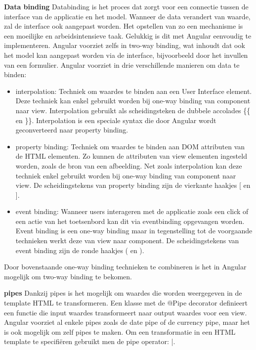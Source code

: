 \textbf{Data binding} \hspace{1cm} Databinding is het proces dat zorgt voor een connectie tussen de interface van de applicatie en het model. Wanneer de data verandert van waarde, zal de interface ook aangepast worden. Het opstellen van zo een mechanisme is een moeilijke en arbeidsintensieve taak. Gelukkig is dit met Angular eenvoudig te implementeren. Angular voorziet zelfs in two-way binding, wat inhoudt dat ook het model kan aangepast worden via de interface, bijvoorbeeld door het invullen van een formulier. Angular voorziet in drie verschillende manieren om data te binden:
\begin{itemize}
	\item interpolation: Techniek om waardes te binden aan een User Interface element.
	Deze techniek kan enkel gebruikt worden bij one-way binding van component naar view. Interpolation gebruikt als scheidingsteken de dubbele accolades \{\{ en \}\}. Interpolation is een speciale syntax die door Angular wordt geconverteerd naar property binding.
	\item property binding: Techniek om waardes te binden aan DOM attributen van de HTML elementen. Zo kunnen de attributen van view elementen ingesteld worden, zoals de bron van een afbeelding. Net zoals interpolation kan deze techniek enkel gebruikt worden bij one-way binding van component naar view. De scheidingstekens van property binding zijn de vierkante haakjes [ en ].
	\item event binding: Wanneer users interageren met de applicatie zoals een click of een actie van het toetsenbord kan dit via eventbinding opgevangen worden. Event binding is een one-way binding maar in tegenstelling tot de voorgaande technieken werkt deze van view naar component. De scheidingstekens van event binding zijn de ronde haakjes ( en ). 
\end{itemize}
Door bovenstaande one-way binding technieken te combineren is het in Angular mogelijk om two-way binding te bekomen. 

\textbf{pipes} \hspace{1cm} Dankzij pipes is het mogelijk om waardes die worden weergegeven in de template HTML te transformeren. Een klasse met de @Pipe decorator definieert een functie die input waardes transformeert naar output waardes voor een view. Angular voorziet al enkele pipes zoals de date pipe of de currency pipe, maar het is ook mogelijk om zelf pipes te maken. Om een transformatie in een HTML template te specifiëren gebruikt men de pipe operator: |. 


